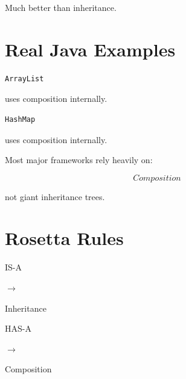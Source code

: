 \documentclass[11pt,a4paper]{book}
\begin{document}
Much better than inheritance.


\section{Real Java Examples}

\begin{verbatim}
ArrayList
\end{verbatim}

uses composition internally.


\begin{verbatim}
HashMap
\end{verbatim}

uses composition internally.


Most major frameworks rely heavily on:

\[
Composition
\]


not giant inheritance trees.


\section{Rosetta Rules}

\begin{rosettarule}

IS-A

$\rightarrow$

Inheritance

\end{rosettarule}


\begin{rosettarule}

HAS-A

$\rightarrow$

Composition

\end{rosettarule}

\end{document}
